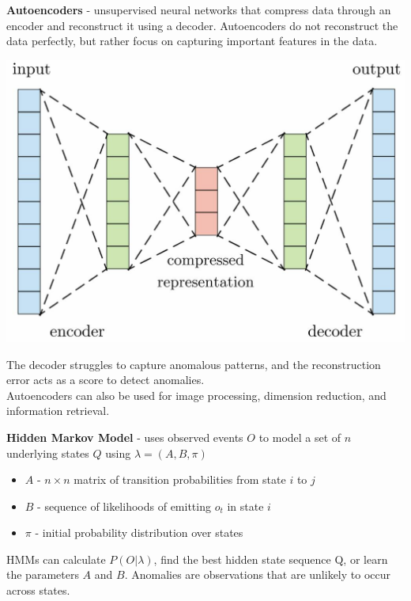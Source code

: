 \documentclass[10pt,landscape]{article}
\begin{document}
\begin{multicols}{3}
\vspace{1mm}
\textbf{Autoencoders} - unsupervised neural networks that compress data through an encoder and reconstruct it using a decoder. Autoencoders do not reconstruct the data perfectly, but rather focus on capturing important features in the data.
\begin{center}
\vspace{-2mm}
    \includegraphics[scale = .19]{images/autoencodeer3.JPG}
    \vspace{-2mm}
\end{center}
The decoder struggles to capture anomalous patterns, and the reconstruction error acts as a score to detect anomalies.
\\
\smallskip
Autoencoders can also be used for image processing, dimension reduction, and information retrieval.
\smallskip

\textbf{Hidden Markov Model} - uses observed events $O$ to model a set of $n$ underlying states $Q$ using $\lambda = (A,B,\pi)$
\begin{itemize}[label={--},leftmargin=4mm]
\itemsep -.4mm
\item $A$ - $n\times n$ matrix of transition probabilities from state $i$ to $j$ \item $B$ - sequence of likelihoods of emitting $o_t$ in state $i$
\item $\pi$ - initial probability distribution over states
\end{itemize}
HMMs can calculate $P(O|\lambda)$, find the best hidden state sequence Q, or learn the parameters $A$ and $B$.
Anomalies are observations that are unlikely to occur across states.


\end{multicols}
\end{document}
